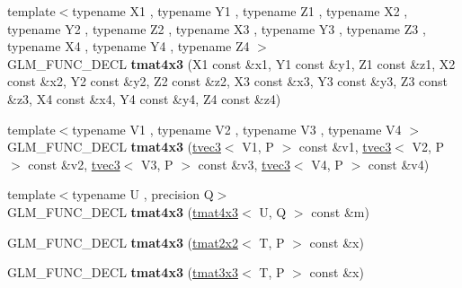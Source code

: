 \begin{DoxyCompactItemize}
\item 
{\footnotesize template$<$typename X1 , typename Y1 , typename Z1 , typename X2 , typename Y2 , typename Z2 , typename X3 , typename Y3 , typename Z3 , typename X4 , typename Y4 , typename Z4 $>$ }\\G\+L\+M\+\_\+\+F\+U\+N\+C\+\_\+\+D\+E\+CL {\bfseries tmat4x3} (X1 const \&x1, Y1 const \&y1, Z1 const \&z1, X2 const \&x2, Y2 const \&y2, Z2 const \&z2, X3 const \&x3, Y3 const \&y3, Z3 const \&z3, X4 const \&x4, Y4 const \&y4, Z4 const \&z4)\hypertarget{structglm_1_1detail_1_1tmat4x3_acca51e285af4cb8da90b02a67daadf05}{}\label{structglm_1_1detail_1_1tmat4x3_acca51e285af4cb8da90b02a67daadf05}

\item 
{\footnotesize template$<$typename V1 , typename V2 , typename V3 , typename V4 $>$ }\\G\+L\+M\+\_\+\+F\+U\+N\+C\+\_\+\+D\+E\+CL {\bfseries tmat4x3} (\hyperlink{structglm_1_1detail_1_1tvec3}{tvec3}$<$ V1, P $>$ const \&v1, \hyperlink{structglm_1_1detail_1_1tvec3}{tvec3}$<$ V2, P $>$ const \&v2, \hyperlink{structglm_1_1detail_1_1tvec3}{tvec3}$<$ V3, P $>$ const \&v3, \hyperlink{structglm_1_1detail_1_1tvec3}{tvec3}$<$ V4, P $>$ const \&v4)\hypertarget{structglm_1_1detail_1_1tmat4x3_a8ef04c1736662e7373db390d7351114f}{}\label{structglm_1_1detail_1_1tmat4x3_a8ef04c1736662e7373db390d7351114f}

\item 
{\footnotesize template$<$typename U , precision Q$>$ }\\G\+L\+M\+\_\+\+F\+U\+N\+C\+\_\+\+D\+E\+CL {\bfseries tmat4x3} (\hyperlink{structglm_1_1detail_1_1tmat4x3}{tmat4x3}$<$ U, Q $>$ const \&m)\hypertarget{structglm_1_1detail_1_1tmat4x3_a1544dbd7a57f8c8d9ee9cbeb4e62bd3a}{}\label{structglm_1_1detail_1_1tmat4x3_a1544dbd7a57f8c8d9ee9cbeb4e62bd3a}

\item 
G\+L\+M\+\_\+\+F\+U\+N\+C\+\_\+\+D\+E\+CL {\bfseries tmat4x3} (\hyperlink{structglm_1_1detail_1_1tmat2x2}{tmat2x2}$<$ T, P $>$ const \&x)\hypertarget{structglm_1_1detail_1_1tmat4x3_a15e5f3c44fc8d0b02c1a507e740d2359}{}\label{structglm_1_1detail_1_1tmat4x3_a15e5f3c44fc8d0b02c1a507e740d2359}

\item 
G\+L\+M\+\_\+\+F\+U\+N\+C\+\_\+\+D\+E\+CL {\bfseries tmat4x3} (\hyperlink{structglm_1_1detail_1_1tmat3x3}{tmat3x3}$<$ T, P $>$ const \&x)\hypertarget{structglm_1_1detail_1_1tmat4x3_a285348e37aea9e646a928c084090999f}{}\label{structglm_1_1detail_1_1tmat4x3_a285348e37aea9e646a928c084090999f}


\end{DoxyCompactItemize}
